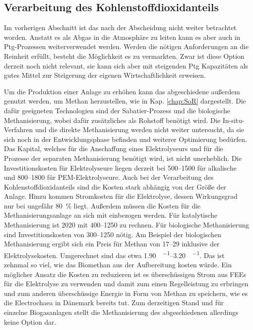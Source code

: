 \subsection{Verarbeitung des Kohlenstoffdioxidanteils}

Im vorherigen Abschnitt ist das  nach der Abscheidung nicht weiter betrachtet worden. Anstatt es als Abgas in die Atmosphäre zu leiten kann es aber auch in \gls{Ptg}-Prozessen weiterverwendet werden. Werden die nötigen Anforderungen an die Reinheit erfüllt, besteht die Möglichkeit es zu vermarkten. Zwar ist diese Option derzeit noch nicht relevant, sie kann sich aber mit steigenden \gls{Ptg} Kapazitäten als gutes Mittel zur Steigerung der eigenen Wirtschaftlichkeit erweisen. \parencite{UmBA19} \smallskip

Um die Produktion einer Anlage zu erhöhen kann das abgeschiedene  außerdem genutzt werden, um Methan herzustellen, wie in Kap. \ref{chap:SoR} dargestellt. Die dafür geeigneten Technologien sind der Sabatier-Prozess und die biologische Methanisierung, wobei dafür zusätzliches  als Rohstoff benötigt wird. Die In-situ-Verfahren und die direkte Methanisierung werden nicht weiter untersucht, da sie sich noch in der Entwicklungsphase befinden und weiterer Optimierung bedürfen. Das Kapital, welches für die Anschaffung eines Elektrolyseurs und für die Prozesse der separaten Methanisierung benötigt wird, ist nicht unerheblich. Die Investitionskosten für Elektrolyseure liegen derzeit bei \SIrange{500}{1500}{\Eurkw} für alkalische und \SIrange{800}{1800}{\Eurkw} für PEM-Elektrolyseure. Auch bei der Verarbeitung des Kohlenstoffdioxidanteils sind die Kosten stark abhängig von der Größe der Anlage. Hinzu kommen Stromkosten für die Elektrolyse, dessen Wirkungsgrad nur bei ungefähr \SI{80}{\percent} liegt. Außerdem müssen die Kosten für die Methanisierungsanlage an sich mit einbezogen werden. Für katalytische Methanisierung ist \SI{2020}{\relax} mit \SIrange{400}{1250}{\Eurkw} zu rechnen. Für biologische Methanisierung sind Investitionskosten von \SIrange{300}{1250}{\Eurkw} nötig. Am Beispiel der biologischen Methanisierung ergibt sich ein Preis für Methan von \SIrange{17}{29}{\ctkwh} inklusive der Elektrolysekosten. Umgerechnet sind das etwa \SIrange{1,90}{3,20}{\sieuro\per\normvol}. Das ist zehnmal so viel, wie das Biomethan aus der Aufbereitung kosten würde. Ein möglicher Ansatz die Kosten zu reduzieren ist es überschüssigen Strom aus \glspl{FEE} für die Elektrolyse zu verwenden und damit zum einen Regelleistung zu erbringen und zum anderen überschüssige Energie in Form von Methan zu speichern, wie es die Electrochaea in Dänemark bereits tut. Zum derzeitigen Stand und für einzelne Biogasanlagen stellt die Methanisierung des abgeschiedenen  allerdings keine Option dar. \parencite{Chaea20} \parencite{4.2b17} \parencite{dena2018b}


